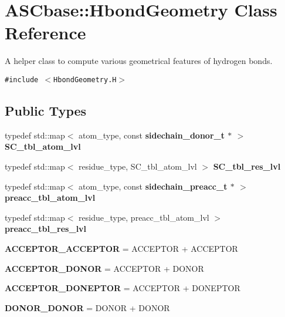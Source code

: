 \section{ASCbase::Hbond\-Geometry Class Reference}
\label{classASCbase_1_1HbondGeometry}
A helper class to compute various geometrical features of hydrogen bonds.  


{\tt \#include $<$Hbond\-Geometry.H$>$}

\subsection*{Public Types}
\begin{CompactItemize}
\item 
typedef std::map$<$ atom\_\-type, const \bf{sidechain\_\-donor\_\-t} $\ast$ $>$ \textbf{SC\_\-tbl\_\-atom\_\-lvl}\label{classASCbase_1_1HbondGeometry_d4cc22996235d8e42553648883ab0ff9}

\item 
typedef std::map$<$ residue\_\-type, SC\_\-tbl\_\-atom\_\-lvl $>$ \textbf{SC\_\-tbl\_\-res\_\-lvl}\label{classASCbase_1_1HbondGeometry_78c70a6cd40282285300c5182331d7ee}

\item 
typedef std::map$<$ atom\_\-type, const \bf{sidechain\_\-preacc\_\-t} $\ast$ $>$ \textbf{preacc\_\-tbl\_\-atom\_\-lvl}\label{classASCbase_1_1HbondGeometry_925f736c4878f7dc63eeeca1118fbf2f}

\item 
typedef std::map$<$ residue\_\-type, preacc\_\-tbl\_\-atom\_\-lvl $>$ \textbf{preacc\_\-tbl\_\-res\_\-lvl}\label{classASCbase_1_1HbondGeometry_c6183711d166dd7189ebdc4d76e957ef}

\item 
\textbf{ACCEPTOR\_\-ACCEPTOR} = ACCEPTOR + ACCEPTOR\label{classASCbase_1_1HbondGeometry_c0cc28273dcab0f6d690a41ff295b4c7f49b49a92bbe24428a7c650861ac95be}

\item 
\textbf{ACCEPTOR\_\-DONOR} = ACCEPTOR + DONOR\label{classASCbase_1_1HbondGeometry_c0cc28273dcab0f6d690a41ff295b4c78cb38b64e9d0137e0587012fc849f4f8}

\item 
\textbf{ACCEPTOR\_\-DONEPTOR} = ACCEPTOR + DONEPTOR\label{classASCbase_1_1HbondGeometry_c0cc28273dcab0f6d690a41ff295b4c70dc886ed7385a07a0b2581df51e71ca5}

\item 
\textbf{DONOR\_\-DONOR} = DONOR + DONOR\label{classASCbase_1_1HbondGeometry_c0cc28273dcab0f6d690a41ff295b4c7fd76d0c5d776c2ebbda73bad9765b86e}


\end{CompactItemize}
